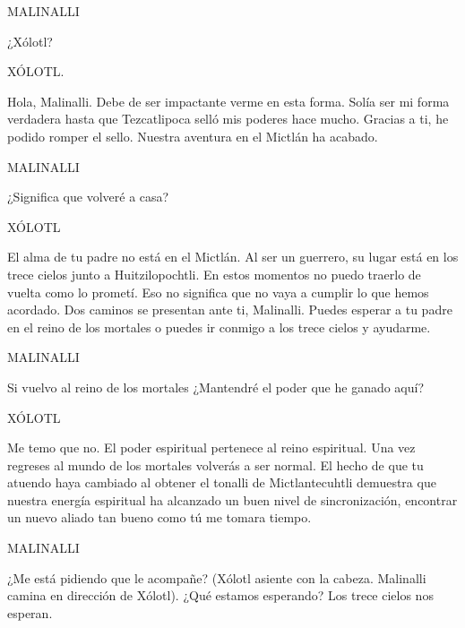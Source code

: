 \documentclass[11pt,letterpaper]{article}
\begin{document}
\begin{center}
MALINALLI
\\
\par 
¿Xólotl?
\\
\par 
XÓLOTL.
\\
\par 
Hola, Malinalli. Debe de ser impactante verme en esta forma. Solía ser mi forma verdadera hasta que Tezcatlipoca selló mis poderes hace mucho. Gracias a ti, he podido romper el sello. Nuestra aventura en el Mictlán ha acabado.
\\
\par 
MALINALLI
\\
\par 
¿Significa que volveré a casa?  
\\
\par 
XÓLOTL
\\
\par 
El alma de tu padre no está en el Mictlán. Al ser un guerrero, su lugar está en los trece cielos junto a Huitzilopochtli. En estos momentos no puedo traerlo de vuelta como lo prometí. Eso no significa que no vaya a cumplir lo que hemos acordado. Dos caminos se presentan ante ti, Malinalli. Puedes esperar a tu padre en el reino de los mortales o puedes ir conmigo a los trece cielos y ayudarme. 
\\
\par 
MALINALLI
\\
\par 
Si vuelvo al reino de los mortales ¿Mantendré el poder que he ganado aquí?
\\
\par 
XÓLOTL
\\
\par 
Me temo que no. El poder espiritual pertenece al reino espiritual. Una vez regreses al mundo de los mortales volverás a ser normal. El hecho de que tu atuendo haya cambiado al obtener el tonalli de Mictlantecuhtli demuestra que nuestra energía espiritual ha alcanzado un buen nivel de sincronización, encontrar un nuevo aliado tan bueno como tú me tomara tiempo.
\\
\par 
MALINALLI
\\
\par 
¿Me está pidiendo que le acompañe? (Xólotl asiente con la cabeza. Malinalli camina en dirección de Xólotl). ¿Qué estamos esperando? Los trece cielos nos esperan. 
\end{center}
\end{document}
